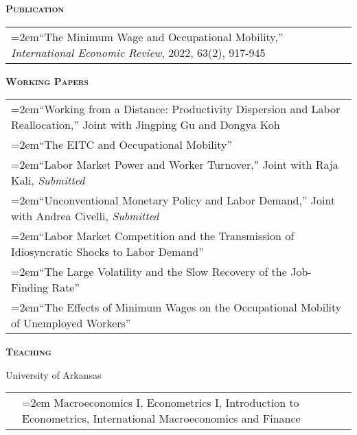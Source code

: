 \documentclass[11pt]{article}
\newenvironment{rSection}[1]{ %
  {\large\bf\textsc{#1}}
  \vspace{0.15cm}
  \begin{list}{}{ %
    \setlength{\leftmargin}{1.5em} %
    \setlength{\rightmargin}{1.5em}
  }
  \item[]
}{
  \end{list}
  \vspace{0.15cm}
}
\begin{document}
\begin{rSection}{Publication}
\begin{tabularx}{\linewidth}{>{\hangindent=2em}X}
``The Minimum Wage and Occupational Mobility,'' \emph{International Economic Review}, 2022, 63(2), 917-945\\
\end{tabularx}
\end{rSection}

\begin{rSection}{Working Papers}
\begin{tabularx}{\linewidth}{>{\hangindent=2em}X}
``Working from a Distance: Productivity Dispersion and Labor Reallocation,'' Joint with Jingping Gu and Dongya Koh\\
``The EITC and Occupational Mobility'' \\
``Labor Market Power and Worker Turnover,'' Joint with Raja Kali, \emph{Submitted}\\
``Unconventional Monetary Policy and Labor Demand,'' Joint with Andrea Civelli, \emph{Submitted}\\
``Labor Market Competition and the Transmission of Idiosyncratic Shocks to Labor Demand''\\
``The Large Volatility and the Slow Recovery of the Job-Finding Rate''\\
``The Effects of Minimum Wages on the Occupational Mobility of Unemployed Workers''\\
\end{tabularx}
\end{rSection}


\begin{rSection}{Teaching}
University of Arkansas\\
\begin{tabularx}{\linewidth}{p{0.3cm} >{\hangindent=2em}X}
& Macroeconomics I, Econometrics I, Introduction to Econometrics, International Macroeconomics and Finance\\[0.3cm]
\end{tabularx}
\end{rSection}
\end{document}
